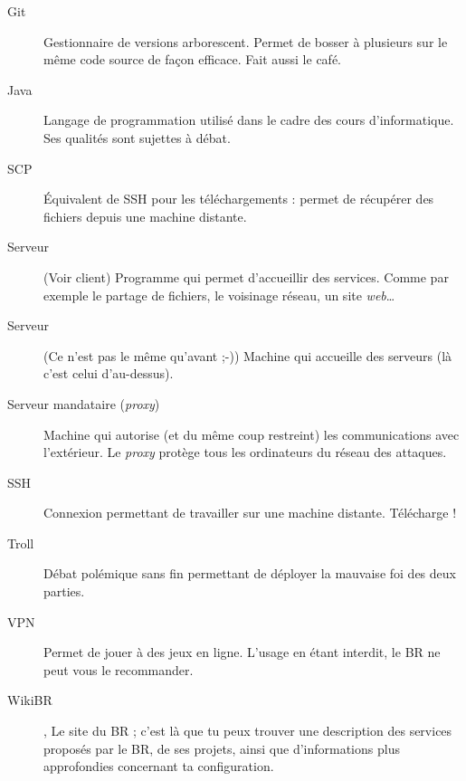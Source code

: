 \begin{description}
  \item[Git] Gestionnaire de versions arborescent. Permet de bosser à plusieurs sur le même code source de façon efficace. Fait aussi le café.
  

  
   \item[Java] Langage de programmation utilisé dans le cadre des cours d'informatique. Ses qualités sont sujettes à débat.
   
   
  \item[SCP] Équivalent de SSH pour les téléchargements : permet de récupérer des fichiers depuis une machine distante.
  
  \item[Serveur] (Voir client) Programme qui permet d'accueillir des services. Comme par exemple le partage de fichiers, le voisinage réseau, un site \emph{web}\ldots\
  \item[Serveur] (Ce n'est pas le même qu'avant ;-)) Machine qui accueille des serveurs (là c'est celui d'au-dessus).
  
  \item[Serveur mandataire (\emph{proxy})] Machine qui autorise
(et du même coup restreint) les communications avec l'extérieur. Le \emph{proxy} protège tous les ordinateurs du réseau des attaques.

  \item[SSH] Connexion permettant de travailler sur une machine distante. Télécharge  !
  
  \item[Troll] Débat polémique sans fin permettant de déployer la mauvaise foi des deux parties.
  \item[VPN] Permet de jouer à des jeux en ligne. L'usage en étant interdit, le BR ne peut vous le recommander.
  
  \item[WikiBR] , Le site du BR ; c'est là que tu peux trouver une description des services proposés par le BR, de ses projets, ainsi que
  d'informations plus approfondies concernant ta configuration.
  

\end{description}
